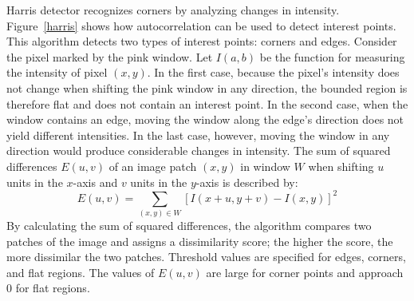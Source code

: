 \begin{figure}[!ht]
\end{figure}
Harris detector recognizes corners by analyzing changes in intensity. Figure~\ref{harris} shows how autocorrelation can be used to detect interest points. This algorithm detects two types of interest points: corners and edges. Consider the pixel marked by the pink window. Let $I(a, b)$ be the function for measuring the intensity of pixel $(x,y)$. In the first case, because the pixel's intensity does not change when shifting the pink window in any direction, the bounded region is therefore flat and does not contain an interest point. In the second case, when the window contains an edge, moving the window along the edge's direction does not yield different intensities. In the last case, however, moving the window in any direction would produce considerable changes in intensity. The sum of squared differences $E(u, v)$ of an image patch $(x, y)$ in window $W$ when shifting $u$ units in the $x$-axis and $v$ units in the $y$-axis is described by:
\begin{equation}\label{intensitychange}
E(u,v) = \sum\limits_{(x, y) \in W} [I(x + u, y + v) - I(x, y)]^2
\end{equation}
By calculating the sum of squared differences, the algorithm compares two patches of the image and assigns a dissimilarity score; the higher the score, the more dissimilar the two patches. Threshold values are specified for edges, corners, and flat regions. The values of $E(u,v)$ are large for corner points and approach $0$ for flat regions.

